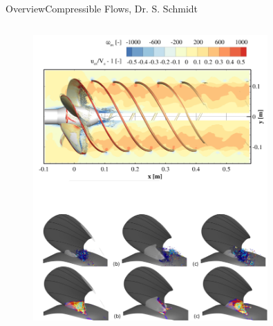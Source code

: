\documentclass[AERbeamer%
              ,optEnglish%
              ,optBiber%
              ,optBibstyleAlphabetic%
              ,optBeamerClassicFormat%
              ]{AERlatex}%
\begin{document}
\begin{frame}[c]{Overview}{Compressible Flows, Dr. S. Schmidt}
\begin{columns}[T]
\begin{column}{0.48\textwidth}
\begin{figure}
                \includegraphics[width=0.8\textwidth]{Steffen2.png}
            \end{figure}
        \end{column}
    \end{columns}
\end{frame}
\end{document}
